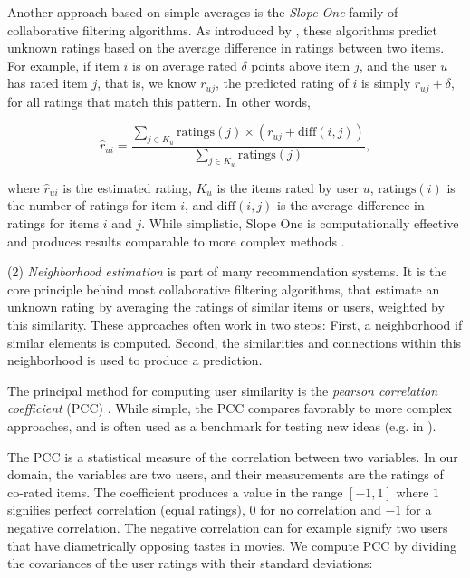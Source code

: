 Another approach based on simple averages is the  \emph{Slope One} family of collaborative filtering algorithms. 
As introduced by \cite{Lemire2005}, these algorithms predict unknown ratings based on the average difference in ratings between two items. 
For example, if item $i$ is on average rated $\delta$ points above item $j$, and the user $u$ has rated item $j$,
that is, we know $r_{uj}$, the predicted rating of $i$ is simply $r_{uj} + \delta$, for all ratings that match this pattern.
In other words,

\begin{equation*}
  \hat{r}_{ui} = \frac{\sum_{j \in K_u} \mathrm{ratings}(j) \times (r_{uj} + \mathrm{diff}(i,j))}{\sum_{j \in K_u} \mathrm{ratings}(j) },
\end{equation*}

where $\hat{r}_{ui}$ is the estimated rating, $K_u$ is the items rated by user $u$, $\mathrm{ratings}(i)$ is the number of ratings for item $i$,
and $\mathrm{diff}(i,j)$ is the average difference in ratings for items $i$ and $j$.
While simplistic, Slope One is computationally effective and produces results comparable to more complex methods \cite[p5]{Lemire2005}.

(2) \emph{Neighborhood estimation} is part of many recommendation systems. 
It is the core principle behind most collaborative filtering algorithms, that
estimate an unknown rating by averaging the ratings of similar items or users, weighted by this similarity.
These approaches often work in two steps: First, a neighborhood if similar elements is computed.
Second, the similarities and connections within this neighborhood is used to produce a prediction.

The principal method for computing user similarity is the \emph{pearson correlation coefficient} (PCC)
\cite[p11]{Segaran2007}.
While simple, the PCC compares favorably to more complex approaches, and is often used as a benchmark 
for testing new ideas (e.g. in \citet{Lemire2005, Ujjin, Konstas}).

The PCC is a statistical measure of the correlation between two variables. In our domain, the variables
are two users, and their measurements are the ratings of co-rated items. 
The coefficient produces a value in the range $[-1,1]$ where $1$ signifies perfect correlation (equal ratings),
$0$ for no correlation and $-1$ for a negative correlation.
The negative correlation can for example signify two users that have diametrically opposing tastes in movies.
We compute PCC by dividing the covariances of the user ratings with their standard deviations:

